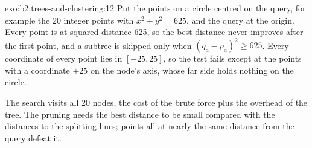 \begin{solution}{exo:b2:trees-and-clustering:12}
Put the points on a circle centred on the query, for example the 20 integer points with $x^2 + y^2 = 625$, and the
query at the origin. Every point is at squared distance 625, so the best distance never improves after the first point,
and a subtree is skipped only when $(q_a - p_a)^2 \geq 625$. Every coordinate of every point lies in $[-25, 25]$, so the
test fails except at the points with a coordinate $\pm 25$ on the node's axis, whose far side holds nothing on the
circle.

The search visits all 20 nodes, the cost of the brute force plus the overhead of the tree. The pruning needs the best
distance to be small compared with the distances to the splitting lines; points all at nearly the same distance from
the query defeat it.
\end{solution}

